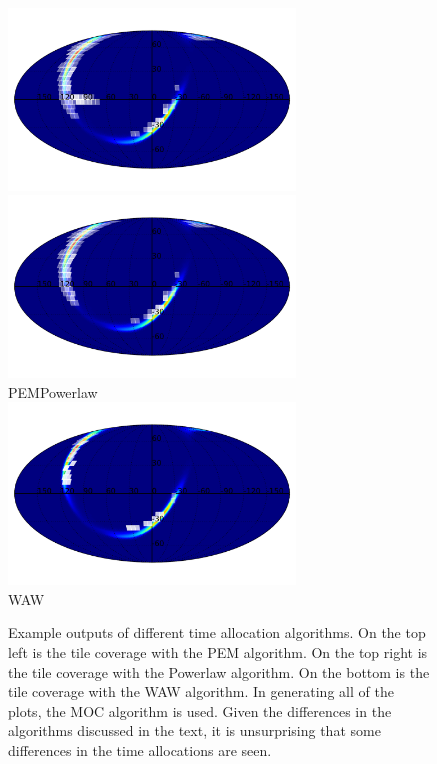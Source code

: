\documentclass[twocolumn]{aastex62}
\begin{document}
\begin{figure}
    \centering
    \includegraphics[width=3in]{plots/coverage_pem.pdf}
    \includegraphics[width=3in]{plots/coverage_powerlaw.pdf}\\
    PEM\hspace{2.6in}Powerlaw\\
    \includegraphics[width=3in]{plots/coverage_waw.pdf}\\
    WAW
    \caption{Example outputs of different time allocation algorithms. On the top left is the tile coverage with the PEM algorithm. On the top right is the tile coverage with the Powerlaw algorithm. On the bottom is the tile coverage with the WAW algorithm. In generating all of the plots, the MOC algorithm is used. Given the differences in the algorithms discussed in the text, it is unsurprising that some differences in the time allocations are seen.}
    \label{fig:timealloc}
\end{figure}
\end{document}
